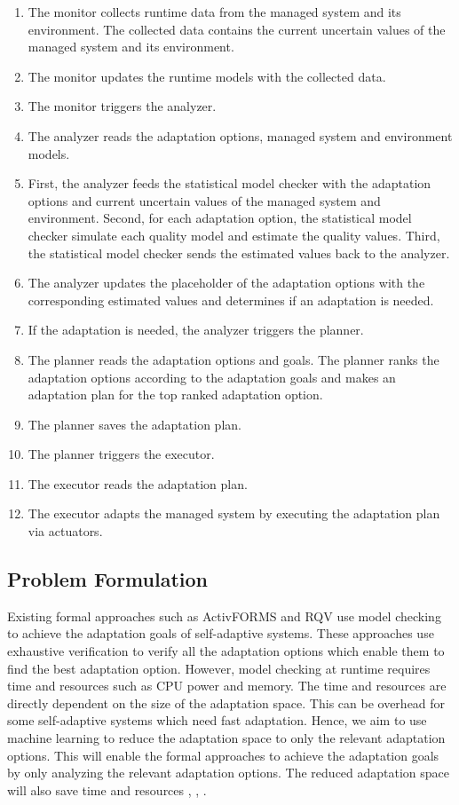 \documentclass[a4paper,12pt]{article}
\begin{document}
\begin{enumerate}
	\item The monitor collects runtime data from the managed system and its environment. The collected data contains the current uncertain values of the managed system and its environment.
	\item The monitor updates the runtime models with the collected data.
	\item The monitor triggers the analyzer.
	\item The analyzer reads the adaptation options, managed system and environment models. 
	\item First, the analyzer feeds the statistical model checker with the adaptation options and current uncertain values of the managed system and environment. Second, for each adaptation option, the statistical model checker simulate each quality model and estimate the quality values. Third, the statistical model checker sends the estimated values back to the analyzer.
	\item The analyzer updates the placeholder of the adaptation options with the corresponding estimated values and determines if an adaptation is needed.
	\item If the adaptation is needed, the analyzer triggers the planner.
	\item The planner reads the adaptation options and goals. The planner ranks the adaptation options according to the adaptation goals and makes an adaptation plan for the top ranked adaptation option.
	\item The planner saves the adaptation plan.
	\item The planner triggers the executor.
	\item The executor reads the adaptation plan.
	\item The executor adapts the managed system by executing the adaptation plan via actuators.
\end{enumerate}
\subsection{Problem Formulation}
Existing formal approaches such as ActivFORMS and RQV use model checking to achieve the adaptation goals of self-adaptive systems. These approaches use exhaustive verification to verify all the adaptation options which enable them to find the best adaptation option. However, model checking at runtime requires time and resources such as CPU power and memory. The time and resources are directly dependent on the size of the adaptation space. This can be overhead for some self-adaptive systems which need fast adaptation. Hence, we aim to use machine learning to reduce the adaptation space to only the relevant adaptation options. This will enable the formal approaches to achieve the adaptation goals by only analyzing the relevant adaptation options. The reduced adaptation space will also save time and resources \cite{SEFSASRCITPOA-2017}, \cite{SEOSASAOTAFC-2017}, \cite{PAFSAS-2017}.
\end{document}
